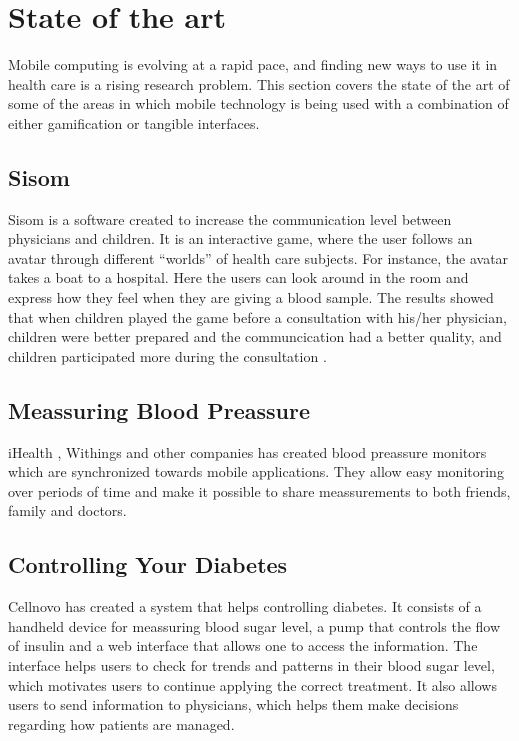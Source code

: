 \section{State of the art}
Mobile computing is evolving at a rapid pace, and finding new ways to use it in health care is a rising research problem. This section covers the state of the art of some of the areas in which mobile technology is being used with a combination of either gamification or tangible interfaces.      

\subsection{Sisom}
Sisom is a software created to increase the communication level between physicians and children. It is an interactive game, where the user follows an avatar through different ``worlds'' of health care subjects. For instance, the avatar takes a boat to a hospital. Here the users can look around in the room and express how they feel when they are giving a blood sample. The results showed that when children played the game before a consultation with his/her physician, children were better prepared and the communcication had a better quality, and children participated more during the consultation \cite{sisom-research}.


\subsection{Meassuring Blood Preassure}
iHealth , Withings and other companies has created blood preassure monitors which are synchronized towards mobile applications. They allow easy monitoring over periods of time and make it possible to share meassurements to both friends, family and doctors.


\subsection{Controlling Your Diabetes}
Cellnovo has created a system that helps controlling diabetes. It consists of a handheld device for meassuring blood sugar level, a pump that controls the flow of insulin and a web interface that allows one to access the information. The interface helps users to check for trends and patterns in their blood sugar level, which motivates users to continue applying the correct treatment. It also allows users to send information to physicians, which helps them make decisions regarding how patients are managed.
      


